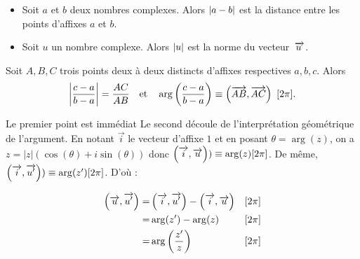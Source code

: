 \documentclass{magnoliaold}
\begin{document}


\begin{proposition}[utile=-3]
\begin{itemize}
\item Soit $a$ et $b$ deux nombres complexes. Alors $\left|a-b\right|$ est la distance entre les points d'affixes $a$ et $b$.
\item Soit $u$ un nombre complexe. Alors $\left|u\right|$ est la norme du vecteur
$\kern 2pt\overrightarrow{\kern -2ptu}$.
\end{itemize}
\end{proposition}

\begin{proposition}[utile=-3]
Soit $A,B,C$ trois points deux à deux distincts d'affixes respectives $a,b,c$. Alors
\[\left|\frac{c-a}{b-a}\right| = \frac{AC}{AB} \quad\text{et}\quad   \arg\left(\frac{c-a}{b-a}\right)\equiv\left(\overrightarrow{AB}, \overrightarrow{AC}\right)\  [2 \pi].\]
\end{proposition}

\begin{preuve}
Le premier point est immédiat Le second découle de l'interprétation géométrique de l'argument. En notant $\overrightarrow{i}$ le vecteur d'affixe $1$ et en posant $\theta=\arg(z)$, on a $z=|z|(\cos(\theta)+i\sin(\theta))$ donc $\left(\overrightarrow{i}, \overrightarrow{u}\right))\equiv \arg(z)[2\pi]$. De même, $\left(\overrightarrow{i}, \overrightarrow{u'}\right))\equiv \arg(z')[2\pi]$. D'où :


\begin{eqnarray*}
\left(\overrightarrow{u}, \overrightarrow{u'}\right)=& \left(\overrightarrow{i}, \overrightarrow{u'}\right)-\left(\overrightarrow{i}, \overrightarrow{u}\right)&[2\pi]\\
=&  \arg(z')-\arg(z)   &[2\pi]\\
=& \arg\left(\frac{z'}{z}\right) &[2\pi]
\end{eqnarray*}
\end{preuve}
\end{document}
